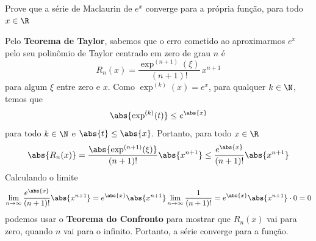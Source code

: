 \documentclass[a4paper,12pt,fleqn]{article}
\begin{document}
Prove que a série de Maclaurin de $e^x$
converge para a própria função, para todo $x\in\R$

\begin{answer}
  Pelo \textbf{Teorema de Taylor}, sabemos que o erro cometido ao aproximarmos
  $e^x$ pelo seu polinômio de Taylor centrado em zero de grau $n$ é
  \[
    R_n(x) = \frac{\exp^{(n+1)}(\xi)}{(n+1)!} \, x^{n+1}
  \]
  para algum $\xi$ entre zero e $x$.
  Como $\exp^{(k)}(x) = e^x$, para qualquer $k\in\N$, temos que
  \[
    \abs{\exp^{(k)}(t)} \leq e^{\abs{x}}
  \]
  para todo $k\in\N$ e $\abs{t}\leq\abs{x}$.
  Portanto, para todo \(x\in\R\)
  \[
    \abs{R_n(x)}
    = \frac{\abs{\exp^{(n+1)}(\xi)}}{(n+1)!}\abs{x^{n+1}}
    \leq \frac{e^{\abs{x}}}{(n+1)!}\abs{x^{n+1}}
  \]
  Calculando o limite
  \[
    \lim_{n\to\infty} \frac{e^{\abs{x}}}{(n+1)!}\abs{x^{n+1}}
    = e^{\abs{x}}\abs{x^{n+1}} \lim_{n\to\infty} \frac{1}{(n+1)!}
    = e^{\abs{x}}\abs{x^{n+1}} \cdot 0
    = 0
  \]
  podemos usar o \textbf{Teorema do Confronto} para mostrar que \(R_n(x)\)
  vai para zero, quando $n$ vai para o infinito.
  Portanto, a série converge para a função.
\end{answer}

\end{document}
